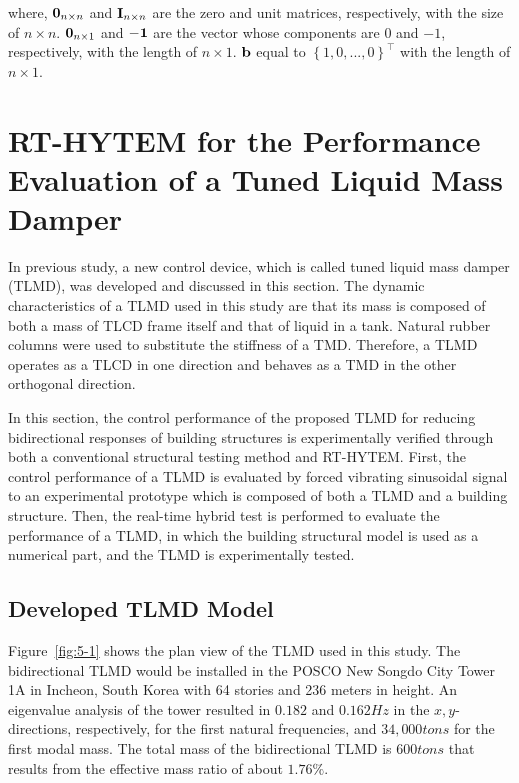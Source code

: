 where, $\mathbf{0}_{n \times n}$ and $\mathbf{I}_{n \times n}$ are the zero and unit matrices, respectively, with the size of $n\times n$. $\mathbf{0}_{n\times 1}$ and $\mathbf{-1}$ are the vector whose components are $0$ and $-1$, respectively, with the length of $n \times 1$. $\mathbf{b}$ equal to $\left\{1,0,...,0\right\}^{\top}$ with the length of $n \times 1$.


\section{RT-HYTEM for the Performance Evaluation of a Tuned Liquid Mass Damper}
\label{chap:5}

In previous study\citet{heo2009performance}, a new control device, which is called tuned liquid mass damper (TLMD), was developed and discussed in this section. The dynamic characteristics of a TLMD used in this study are that its mass is composed of both a mass of TLCD frame itself and that of liquid in a tank. Natural rubber columns were used to substitute the stiffness of a TMD. Therefore, a TLMD operates as a TLCD in one direction and behaves as a TMD in the other orthogonal direction. 

In this section, the control performance of the proposed TLMD for reducing bidirectional responses of building structures is experimentally verified through both a conventional structural testing method and RT-HYTEM. First, the control performance of a TLMD is evaluated by forced vibrating sinusoidal signal to an experimental prototype which is composed of both a TLMD and a  building structure. Then, the real-time hybrid test is performed to evaluate the performance of a TLMD, in which the building structural model is used as a numerical part, and the TLMD is experimentally tested.

\subsection{Developed TLMD Model}
Figure~\ref{fig:5-1} shows the plan view of the TLMD used in this study. The bidirectional TLMD would be installed in the POSCO New Songdo City Tower 1A in Incheon, South Korea with 64 stories and 236 meters in height. An eigenvalue analysis of the tower resulted in $0.182$ and $0.162Hz$ in the $x, y$-directions, respectively, for the first natural frequencies, and $34,000tons$ for the first modal mass. The total mass of the bidirectional TLMD is $600tons$ that results from the effective mass ratio of about $1.76\%$.

